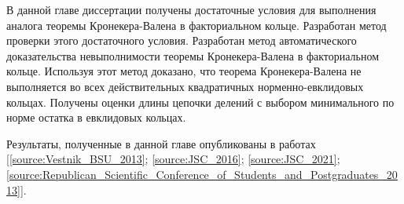 \documentclass[_00_dissertation.tex]{subfiles}
\begin{document}
В данной главе диссертации получены достаточные условия для выполнения аналога теоремы Кронекера-Валена в факториальном кольце.
Разработан метод проверки этого достаточного условия.
Разработан метод автоматического доказательства невыполнимости теоремы Кронекера-Валена в факториальном кольце.
Используя этот метод доказано, что теорема Кронекера-Валена не выполняется во всех действительных квадратичных норменно-евклидовых кольцах.
Получены оценки длины цепочки делений с выбором минимального по норме остатка в евклидовых кольцах.

Результаты, полученные в данной главе опубликованы в работах [\ref{source:Vestnik_BSU_2013}; \ref{source:JSC_2016}; \ref{source:JSC_2021}; \ref{source:Republican_Scientific_Conference_of_Students_and_Postgraduates_2013}].

\onlyinsubfile{
    
}
\end{document}
